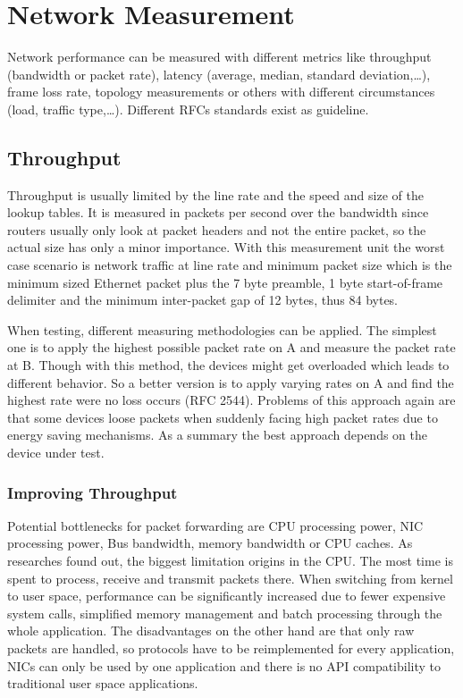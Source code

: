 
\section{Network Measurement}
Network performance can be measured with different metrics like throughput (bandwidth or packet rate), latency (average, median, standard deviation,\dots), frame loss rate, topology measurements or others with different circumstances (load, traffic type,\dots).
Different RFCs standards exist as guideline.

\subsection{Throughput}
Throughput is usually limited by the line rate and the speed and size of the lookup tables.
It is measured in packets per second over the bandwidth since routers usually only look at packet headers and not the entire packet, so the actual size has only a minor importance.
With this measurement unit the worst case scenario is network traffic at line rate and minimum packet size which is the minimum sized Ethernet packet plus the 7 byte preamble, 1 byte start-of-frame delimiter and the minimum inter-packet gap of 12 bytes, thus 84 bytes.\\
\vspace{4pt}

When testing, different measuring methodologies can be applied.
The simplest one is to apply the highest possible packet rate on A and measure the packet rate at B.
Though with this method, the devices might get overloaded which leads to different behavior.
So a better version is to apply varying rates on A and find the highest rate were no loss occurs (RFC 2544).
Problems of this approach again are that some devices loose packets when suddenly facing high packet rates due to energy saving mechanisms.
As a summary the best approach depends on the device under test.

\subsubsection*{Improving Throughput}
Potential bottlenecks for packet forwarding are CPU processing power, NIC processing power, Bus bandwidth, memory bandwidth or CPU caches.
As researches found out, the biggest limitation origins in the CPU.
The most time is spent to process, receive and transmit packets there.
When switching from kernel to user space, performance can be significantly increased due to fewer expensive system calls, simplified memory management and batch processing through the whole application.
The disadvantages on the other hand are that only raw packets are handled, so protocols have to be reimplemented for every application, NICs can only be used by one application and there is no API compatibility to traditional user space applications.

